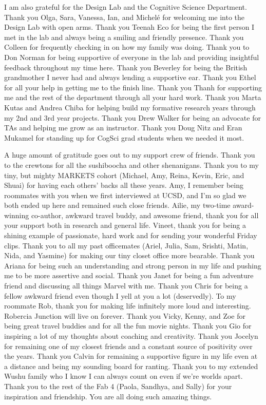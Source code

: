 I am also grateful for the Design Lab and the Cognitive Science Department. Thank you Olga, Sara, Vanessa, Ian, and Michel\'{e} for welcoming me into the Design Lab with open arms. Thank you Teenah Eco for being the first person I met in the lab and always being a smiling and friendly presence. Thank you Colleen for frequently checking in on how my family was doing. Thank you to Don Norman for being supportive of everyone in the lab and providing insightful feedback throughout my time here. Thank you Beverley for being the British grandmother I never had and always lending a supportive ear. Thank you Ethel for all your help in getting me to the finish line. Thank you Thanh for supporting me and the rest of the department through all your hard work. Thank you Marta Kutas and Andrea Chiba for helping build my formative research years through my 2nd and 3rd year projects. Thank you Drew Walker for being an advocate for TAs and helping me grow as an instructor. Thank you Doug Nitz and Eran Mukamel for standing up for CogSci grad students when we needed it most.
 
A huge amount of gratitude goes out to my support crew of friends. Thank you to the crewtons for all the sushiboocha and other shenanigans. Thank you to my tiny, but mighty MARKETS cohort (Michael, Amy, Reina, Kevin, Eric, and Shuai) for having each others' backs all these years. Amy, I remember being roommates with you when we first interviewed at UCSD, and I'm so glad we both ended up here and remained such close friends. Ailie, my two-time award-winning co-author, awkward travel buddy, and awesome friend, thank you for all your support both in research and general life. Vineet, thank you for being a shining example of passionate, hard work and for sending your wonderful Friday clips. Thank you to all my past officemates (Ariel, Julia, Sam, Srishti, Matin, Nida, and Yasmine) for making our tiny closet office more bearable. Thank you Ariana for being such an understanding and strong person in my life and pushing me to be more assertive and social. Thank you Janet for being a fun adventure friend and discussing all things Marvel with me. Thank you Chris for being a fellow awkward friend even though I yell at you a lot (deservedly). To my roommate Rob, thank you for making life infinitely more loud and interesting. Robercia Junction will live on forever. Thank you Vicky, Kenny, and Zoe for being great travel buddies and for all the fun movie nights. Thank you Gio for inspiring a lot of my thoughts about coaching and creativity. Thank you Jocelyn for remaining one of my closest friends and a constant source of positivity over the years. Thank you Calvin for remaining a supportive figure in my life even at a distance and being my sounding board for ranting. Thank you to my extended Wushu family who I know I can always count on even if we're worlds apart. Thank you to the rest of the Fab 4 (Paola, Sandhya, and Sally) for your inspiration and friendship. You are all doing such amazing things. 
 
